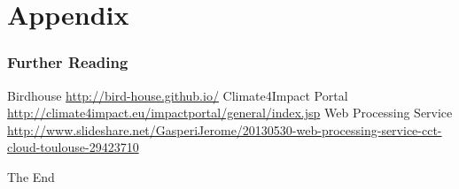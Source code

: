 \documentclass{beamer}
\begin{document}
  \section{Appendix}
  
   \begin{frame}[allowframebreaks]
    \frametitle<presentation>{Further Reading}    
    \begin{thebibliography}{10}    
      \beamertemplatearticlebibitems
      Birdhouse
      \newblock \url{http://bird-house.github.io/}
      Climate4Impact Portal
      \newblock \url{http://climate4impact.eu/impactportal/general/index.jsp}
      Web Processing Service
      \newblock \url{http://www.slideshare.net/GasperiJerome/20130530-web-processing-service-cct-cloud-toulouse-29423710}
   
    \end{thebibliography}
    
  \end{frame}
  

  \begin{frame}
    \Huge{\centerline{The End}}
  \end{frame}

\end{document}
